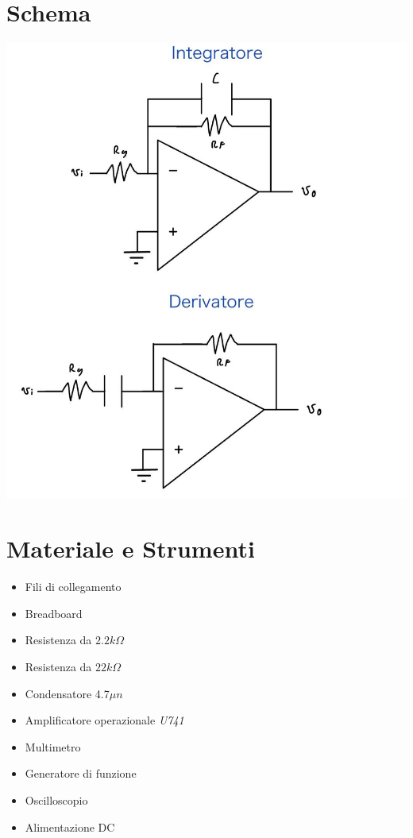\documentclass[12pt]{article}
\begin{document}
\section{Schema}
\begin{flushleft}
    \includegraphics[scale=0.2]{schema.jpg}
\end{flushleft}
\section{Materiale e Strumenti}
\begin{multicols}{2}
    \begin{itemize}
    \item Fili di collegamento
    \item Breadboard
    \item Resistenza da $2.2k\Omega$
    \item Resistenza da $22k\Omega$
    \item Condensatore 4.7$\mu n$
    \item Amplificatore operazionale \textit{U741}
    \end{itemize}
    \vfill\null
    \columnbreak
    \begin{itemize}
    \item Multimetro
    \item Generatore di funzione
    \item Oscilloscopio
    \item Alimentazione DC 
    \end{itemize}
    \vfill\null
    \end{multicols}
\end{document}
